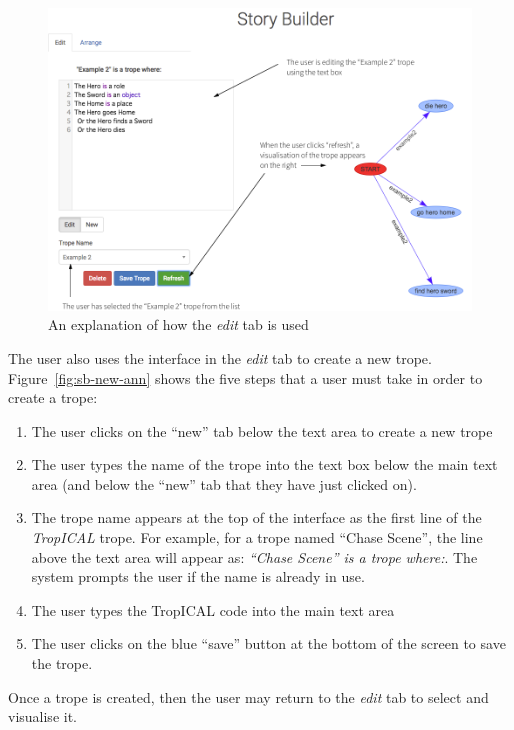 \documentclass[11pt]{report}
\begin{document}
\begin{figure}[!t]
\centerline{\includegraphics[width=\textwidth]{storybuilder-a2.png}}
\caption{An explanation of how the \emph{edit} tab is used}\label{fig:sb-edit-ann2}
\end{figure}

The user also uses the interface in the \emph{edit} tab to create a new trope.
Figure~\ref{fig:sb-new-ann} shows the five steps that a user must take in order
to create a trope:

\begin{enumerate}
  \item The user clicks on the ``new'' tab below the text area to create a new trope
  \item The user types the name of the trope into the text box below the main
    text area (and below the ``new'' tab that they have just clicked on).
  \item The trope name appears at the top of the interface as the first line of
    the \emph{TropICAL} trope. For example, for a trope named ``Chase Scene'',
    the line above the text area will appear as: \emph{``Chase Scene'' is a
      trope where:}. The system prompts the user if the name is already in use.
  \item The user types the TropICAL code into the main text area
  \item The user clicks on the blue ``save'' button at the bottom of the screen
    to save the trope.
\end{enumerate}

Once a trope is created, then the user may return to the \emph{edit} tab to
select and visualise it.
\end{document}
